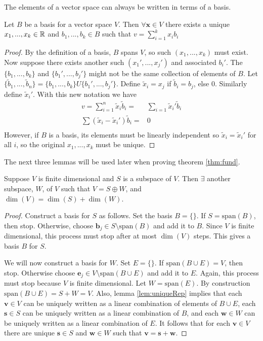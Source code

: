 The elements of a vector space can always be written in terms of a
basis. 
\begin{lemma} \label{lem:uniqueRep}
  Let $B$ be a basis for a vector space $V$. Then
  $\forall \mathbf{x} \in V$ there exists a unique $x_1, ..., x_k \in \mathbb{R}$ and
  $b_1, ..., b_k \in B$
  such that $ v = \sum_{i=1}^k x_i b_i$  
\end{lemma}
\begin{proof}
  By the definition of a basis, $B$ spans $V$, so such
  $(x_1, ..., x_k)$ must exist. Now suppose there exists another such
  $(x_1', ..., x_j')$ and associated $b_i'$. The $\{b_1, ..., b_k\}$ and
  $\{b_1', ..., b_j'\}$ might not be the same collection of elements
  of $B$. Let $\{\tilde{b}_1, ..., \tilde{b}_n \} =  \{b_1, ...,
  b_k\} U \{b_1', ..., b_j'\}$. Define $\tilde{x}_i = x_j$ if
  $\tilde{b}_i = b_j$, else $0$. Similarly define $\tilde{x}_i'$. With
  this new notation we have
  \begin{align*}
    v = \sum_{i=1}^n \tilde{x}_i \tilde{b}_i = & \sum_{i=1} \tilde{x}_i' \tilde{b}_i \\
    \sum (\tilde{x}_i - \tilde{x}_i')\tilde{b}_i = & 0 \\
  \end{align*}
  However, if $B$ is a basis, its elements must be linearly
  independent so $\tilde{x}_i = \tilde{x}_i'$ for all $i$, so the
  original $x_1, ..., x_k$ must be unique.
\end{proof}

The next three lemmas will be used later when proving theorem \ref{thm:fund}.
\begin{lemma}\label{lem:directSum}
  Suppose $V$ is finite dimensional and $S$ is a subspace of $V$. Then
  $\exists$ another subspace, $W$, of $V$ such that $V = S \oplus W$,
  and $\dim(V) = \dim(S) + \dim(W)$.
\end{lemma}
\begin{proof}
  Construct a basis for $S$ as follows. Set the basis $B = \{\}$. If
  $S = \text{span}(B)$, then stop. Otherwise, choose $\mathbf{b}_j \in
  S \setminus \text{span}(B)$ and add it to $B$. Since $V$ is finite
  dimensional, this process must stop after at most $\dim(V)$
  steps. This gives a basis $B$ for $S$. 

  We will now construct a basis for $W$. Set $E = \{\}$. If
  $\text{span}(B \cup E) = V$, then stop. Otherwise choose $\mathbf{e}_j \in V
  \setminus \text{span}(B \cup E)$ and add it to $E$. Again, this
  process must stop because $V$ is finite dimensional. Let $W =
  \text{span}(E)$. By construction $\text{span}(B \cup E) = S + W =
  V$. Also, lemma \ref{lem:uniqueRep} implies that each $\mathbf{v}
  \in V$ can be uniquely written as a linear combination of elements
  of $B \cup E$, each $\mathbf{s} \in S$ can be uniquely written as a
  linear combination of $B$, and each $\mathbf{w} \in W$ can be
  uniquely written as a linear combination of $E$. It follows that for
  each $\mathbf{v} \in V$ there are unique $\mathbf{s} \in S$ and
  $\mathbf{w} \in W$ such that $\mathbf{v} = \mathbf{s} +
  \mathbf{w}$. 
\end{proof}


